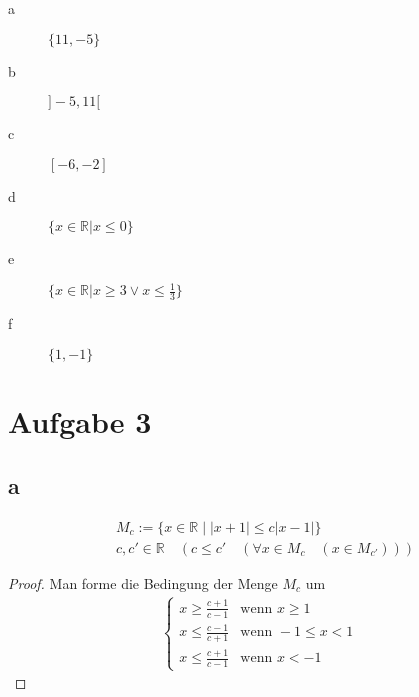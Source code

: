 \documentclass[a4paper,10pt]{article}
\begin{document}
\begin{description}
 \item[a] $\{11, -5\}$
 \item[b] $]-5, 11[$
 \item[c] $[-6, -2]$
 \item[d] $\{ x \in \mathbb{R} | x \le 0\}$
 \item[e] $\{ x \in \mathbb{R} | x \ge 3 \lor x \le \frac{1}{3}\}$
 \item[f] $\{1, -1\}$
\end{description}

\section*{Aufgabe 3}

\subsection*{a}

\begin{claim}
 \begin{align*}
  & M_c := \{ x \in \mathbb{R} \mid |x + 1| \le c|x - 1| \}\\
  & c, c' \in \mathbb{R} \quad (c \le c' \quad (\forall x \in M_c \quad (x \in M_{c'})))
 \end{align*}
\end{claim}

\begin{proof}
 Man forme die Bedingung der Menge $M_c$ um
 \begin{align*}
  \begin{cases}
   x \ge \frac{c + 1}{c - 1} &\text{wenn } x \ge 1\\
   x \le \frac{c - 1}{c + 1} &\text{wenn } -1 \le x < 1\\
   x \le \frac{c + 1}{c - 1} &\text{wenn } x < -1
  \end{cases}
 \end{align*}
\end{proof}
\end{document}
